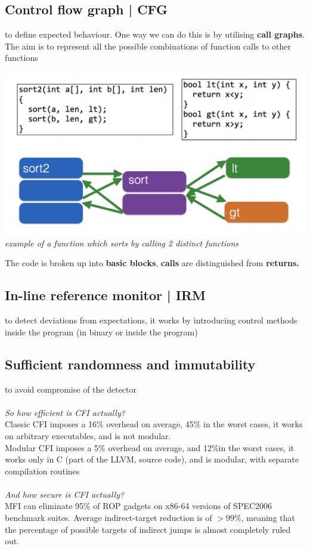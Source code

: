 \documentclass[11pt, oneside]{article}   	%
\begin{document}
\subsection*{Control flow graph | CFG} to define expected behaviour.
One way we can do this is by utilising \textbf{call graphs}. The aim is to represent all the possible combinations of function calls to other functions
\begin{center}
\includegraphics[scale = 0.4]{cfi}\\
\emph{example of a function which sorts by calling 2 distinct functions}
\end{center}
The code is broken up into \textbf{basic blocks}, \textbf{calls} are distinguished from \textbf{returns.}


\subsection*{In-line reference monitor | IRM} to detect deviations from expectations, it works by introducing control methods inside the program (in binary or inside the program)
\subsection*{Sufficient randomness and immutability} to avoid compromise of the detector\\\\
\emph{So how efficient is CFI actually?}\\
Classic CFI imposes a 16\% overhead on average, 45\% in the worst cases, it works on arbitrary executables, and is not modular.\\
Modular CFI imposes a 5\% overhead on average, and 12\%in the worst cases, it works only in C (part of the LLVM, source code), and is modular, with separate compilation routines\\\\
\emph{And how secure is CFI actually?}\\
MFI can eliminate 95\% of ROP gadgets on x86-64 versions of SPEC2006 benchmark suites. Average indirect-target reduction is of $>99\%$, meaning that the percentage of possible targets of indirect jumps is almost completely ruled out.
\end{document}
